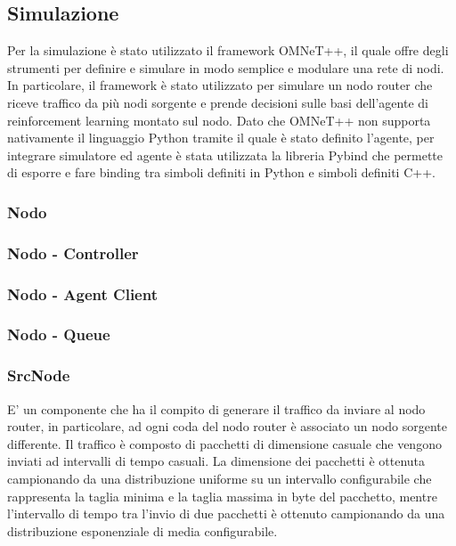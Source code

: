 \documentclass[conference]{IEEEtran}
\begin{document}
\subsection{Simulazione}
Per la simulazione è stato utilizzato il framework OMNeT++, il quale offre degli strumenti per definire e simulare in modo semplice e modulare una rete di nodi. In particolare, il framework è stato utilizzato per simulare un nodo router che riceve traffico da più nodi sorgente e prende decisioni sulle basi dell'agente di reinforcement learning montato sul nodo. Dato che OMNeT++ non supporta nativamente il linguaggio Python tramite il quale è stato definito l'agente, per integrare simulatore ed agente è stata utilizzata la libreria Pybind  che permette di esporre e fare binding tra simboli definiti in Python e simboli definiti C++. 

\subsubsection{Nodo}

\subsubsection{Nodo - Controller}

\subsubsection{Nodo - Agent Client}

\subsubsection{Nodo - Queue}

\subsubsection{SrcNode}
E' un componente che ha il compito di generare il traffico da inviare al nodo router, in particolare, ad ogni coda del nodo router è associato un nodo sorgente differente. Il traffico è composto di pacchetti di dimensione casuale che vengono inviati ad intervalli di tempo casuali. La dimensione dei pacchetti è ottenuta campionando da una distribuzione uniforme su un intervallo configurabile che rappresenta la taglia minima e la taglia massima in byte del pacchetto, mentre l'intervallo di tempo tra l'invio di due pacchetti è ottenuto campionando da una distribuzione esponenziale di media configurabile.
\end{document}
